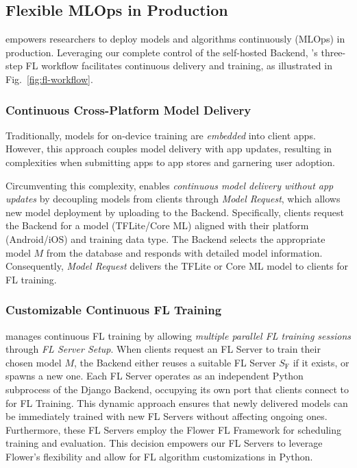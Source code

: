 \documentclass[conference]{IEEEtran}
\begin{document}
\subsection{Flexible MLOps in Production}
\label{sec:mlops}
\newcommand{\model}{$M$}
\newcommand{\fs}{$S_\mathrm F$}
\FedKit{} empowers researchers to deploy models and algorithms continuously (MLOps)
in production.
Leveraging our complete control of the self-hosted Backend,
\FedKit{}'s three-step FL workflow
facilitates continuous delivery and training,
as illustrated in Fig.~\ref{fig:fl-workflow}.
\subsubsection{Continuous Cross-Platform Model Delivery}
Traditionally, models for on-device training are \textit{embedded} into client apps.
However, this approach couples model delivery with app updates,
resulting in complexities when submitting apps to app stores and garnering user adoption.

Circumventing this complexity,
\FedKit{} enables \textit{continuous model delivery without app updates} by
decoupling models from clients through \textit{Model Request},
which allows new model deployment by uploading to the Backend.
Specifically, clients request the Backend for a model (TFLite/Core ML)
aligned with
their platform (Android/iOS) and training data type.
The Backend selects the appropriate model \model{} from the database and
responds with detailed model information.
Consequently, \textit{Model Request} delivers the TFLite or Core ML model
to clients for FL training.

\subsubsection{Customizable Continuous FL Training}
\FedKit{} manages continuous FL training by allowing \textit{multiple parallel FL training sessions}
through \textit{FL Server Setup}.
When clients request an FL Server to
train their chosen model \model{},
the Backend either reuses a suitable FL Server \fs{} if it exists,
or spawns a new one.
Each FL Server
operates as an independent Python subprocess of the Django Backend,
occupying its own port that
clients connect to for FL Training.
This dynamic approach ensures that
newly delivered models can be immediately trained with new FL Servers
without affecting ongoing ones.
Furthermore,
these FL Servers employ the Flower FL Framework for
scheduling training and evaluation.
This decision empowers our FL Servers to leverage Flower's flexibility and
allow for FL algorithm customizations in Python.
\end{document}
